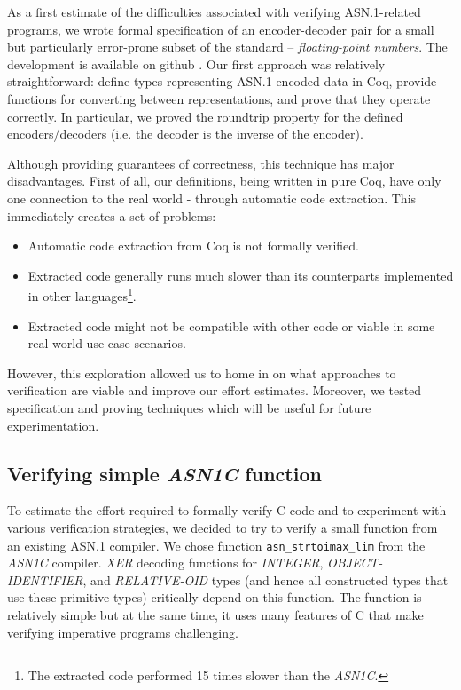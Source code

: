 \documentclass[10p,conference]{IEEEtran}
\begin{document}
As a first estimate of the difficulties associated with verifying
ASN.1-related programs, we wrote formal specification of an
encoder-decoder pair for a small but particularly error-prone subset
of the standard -- \textit{floating-point numbers}. The development is
available on github \cite{asn1fpcoq}. Our first approach was
relatively straightforward: define types representing ASN.1-encoded
data in Coq, provide functions for converting between representations,
and prove that they operate correctly. In particular, we proved the
roundtrip property for the defined encoders/decoders (i.e. the decoder is the inverse of the encoder).

Although providing guarantees of correctness, this technique has major disadvantages.
First of all, our definitions, being written in pure Coq, have only one
connection to the real world - through automatic code extraction.
This immediately creates a set of problems:

\begin{itemize}
\item Automatic code extraction from Coq is not formally verified.
\item Extracted code generally runs much slower than its counterparts implemented in other languages\footnote{The extracted code performed 15 times slower than the \emph{ASN1C}.}.
\item Extracted code might not be compatible with other code or viable in some real-world use-case scenarios.
\end{itemize}

However, this exploration allowed us to home in on what approaches
to verification are viable and improve our effort estimates. Moreover, we tested specification and proving techniques which will be useful for future experimentation.

\subsection{Verifying simple \emph{ASN1C} function}

To estimate the effort required to formally verify C code and to
experiment with various verification strategies, we decided to try to
verify a small function from an existing ASN.1 compiler. We chose
function \texttt{asn\_strtoimax\_lim} from the \emph{ASN1C} compiler. \emph{XER}
decoding functions for \emph{INTEGER}, \emph{OBJECT-IDENTIFIER}, and
\emph{RELATIVE-OID} types (and hence all constructed types that use
these primitive types) critically depend on this function. The
function is relatively simple but at the same time, it uses many features
of C that make verifying imperative programs challenging.
\end{document}
